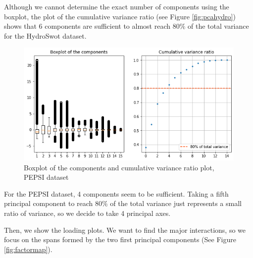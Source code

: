Although we cannot determine the exact number of components using the boxplot, the plot of the cumulative variance ratio (see Figure \ref{fig:pcahydro}) shows that 6 components are sufficient to almost reach $80\%$ of the total variance for the HydroSwot dataset.

 \begin{figure}[H]
     \centering
     \includegraphics[scale = 0.55]{Graph/pepsi_pca.png}
     \caption{Boxplot of the components and cumulative variance ratio plot, PEPSI dataset}
     \label{fig:pcapepsi}
 \end{figure}

For the PEPSI dataset, 4 components seem to be sufficient. Taking a fifth principal component to reach $80\%$ of the total variance just represents a small ratio of variance, so we decide to take 4 principal axes.

Then, we show the loading plots. We want to find the major interactions, so we focus on the spans formed by the two first principal components (See Figure \ref{fig:factormap}).

